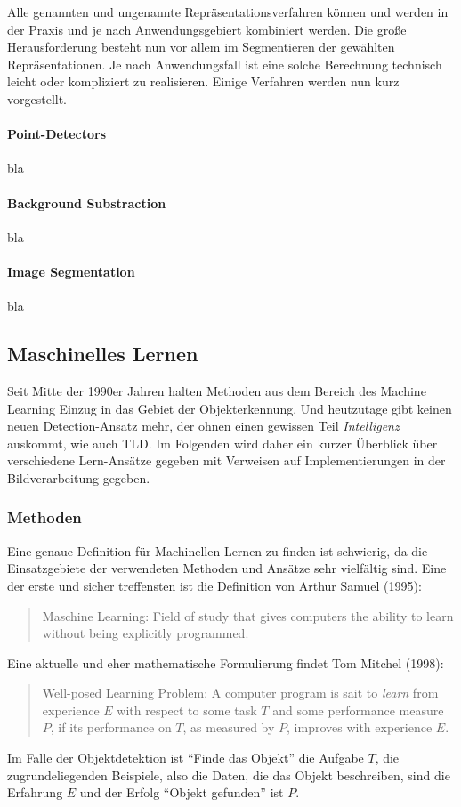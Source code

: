 Alle genannten und ungenannte Repräsentationsverfahren können und werden in der Praxis und je nach Anwendungsgebiert kombiniert werden. Die große Herausforderung besteht nun vor allem im Segmentieren der gewählten Repräsentationen. Je nach Anwendungsfall ist eine solche Berechnung technisch leicht oder kompliziert zu realisieren. Einige Verfahren werden nun kurz vorgestellt.

\paragraph{Point-Detectors}
bla

\paragraph{Background Substraction}
bla

\paragraph{Image Segmentation}
bla

\subsection{Maschinelles Lernen}
Seit Mitte der 1990er Jahren halten Methoden aus dem Bereich des Machine Learning Einzug in das Gebiet der Objekterkennung. Und heutzutage gibt keinen neuen Detection-Ansatz mehr, der ohnen einen gewissen Teil \textit{Intelligenz} auskommt, wie auch TLD. Im Folgenden wird daher ein kurzer Überblick über verschiedene Lern-Ansätze gegeben mit Verweisen auf Implementierungen in der Bildverarbeitung gegeben.

\subsubsection{Methoden}
Eine genaue Definition für Machinellen Lernen zu finden ist schwierig, da die Einsatzgebiete der verwendeten Methoden und Ansätze sehr vielfältig sind. Eine der erste und sicher treffensten ist die Definition von Arthur Samuel (1995):
\begin{quote}
Maschine Learning: Field of study that gives computers the ability to learn without being explicitly programmed. 
\end{quote}
Eine aktuelle und eher mathematische Formulierung findet Tom Mitchel (1998):
\begin{quote}
Well-posed Learning Problem: A computer program is sait to \textit{learn} from experience $E$ with respect to some task $T$ and some performance measure $P$, if its performance on $T$, as measured by $P$, improves with experience $E$.
\end{quote}
Im Falle der Objektdetektion ist ``Finde das Objekt'' die Aufgabe $T$, die zugrundeliegenden Beispiele, also die Daten, die das Objekt beschreiben, sind die Erfahrung $E$ und der Erfolg ``Objekt gefunden'' ist $P$.

